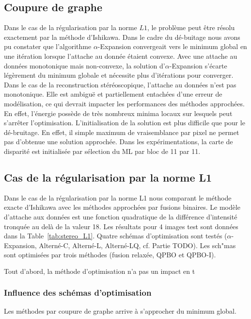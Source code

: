 \documentclass[../main/These_Mathias_Paget.tex]{subfiles}
\begin{document}
\subsection{Coupure de graphe}

Dans le cas de la régularisation par la norme $L1$, le problème peut être résolu exactement par la méthode d'Ishikawa. Dans le cadre du dé-buitage nous avons pu constater que l'algorithme $\alpha$-Expansion convergeait vers le minimum global en une itération lorsque l'attache au donnée étaient convexe. Avec une attache au données monotonique mais non-convexe, la solution d'$\alpha$-Expansion s'écarte légèrement du minimum globale et nécessite plus d'itérations pour converger. Dans le cas de la reconstruction stéréoscopique, l'attache au données n'est pas monotonique. Elle est ambiguë et partiellement entachées d'une erreur de modélisation, ce qui devrait impacter les performances des méthodes approchées. En effet, l'énergie possède de très nombreux minima locaux sur lesquels peut s’arrêter l'optimisation. L'initialisation de la solution est plus difficile que pour le dé-bruitage. En effet, il simple maximum de vraisemblance par pixel ne permet pas d'obtenue une solution approchée. Dans les expérimentations, la carte de disparité est initialisée par sélection du ML par bloc de 11 par 11.


\subsection{Cas de la régularisation par la norme L1}

Dans le cas de la régularisation par la norme L1 nous comparant le méthode exacte d'Ishikawa avec les méthodes approchées par fusions binaires. Le modèle d'attache aux données est une fonction quadratique de la différence d'intensité tronquée au delà de la valeur 18. Les résultats pour 4 images test sont données dans la Table~\ref{tab:stereo_L1}. Quatre schémas d'optimisation sont testés ($\alpha$-Expansion, Alterné-C, Alterné-L, Alterné-LQ, cf. Partie TODO). Les sch"mas sont optimisées par trois méthodes (fusion relaxée, QPBO et QPBO-I).

Tout d'abord, la méthode d'optimisation n'a pas un impact en t


\subsubsection{Influence des schémas d'optimisation}

Les méthodes par coupure de graphe arrive à s'approcher du minimum global.
\end{document}
